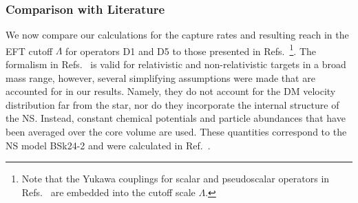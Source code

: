 \subsubsection{Comparison with Literature}
\label{ch4:subsubsec:literature_comp_NS}

We now compare our calculations for the capture rates and resulting reach in the EFT cutoff $\Lambda$ for operators D1 and D5 to those presented in Refs.~\cite{Joglekar:2019vzy_sep_Relativisticcapturedark,Joglekar:2020liw_Darkkineticheating}\footnote{Note that the Yukawa couplings for scalar and pseudoscalar operators in Refs.~\cite{Joglekar:2019vzy_sep_Relativisticcapturedark,Joglekar:2020liw_Darkkineticheating} are embedded into the cutoff scale $\Lambda$.}.
The formalism in Refs.~\cite{Joglekar:2019vzy_sep_Relativisticcapturedark,Joglekar:2020liw_Darkkineticheating} is valid for relativistic and non-relativistic targets in a broad mass range, however, several simplifying assumptions were made that are accounted for in our results. Namely, they do not account for the DM velocity distribution far from the star, nor do they incorporate the internal structure of the NS. Instead, constant chemical potentials and particle abundances that have been averaged over the core volume are used. These quantities correspond to the NS model BSk24-2 and were calculated in Ref.~\cite{Bell:2019pyc_jun_CaptureLeptophilicDark}. 



